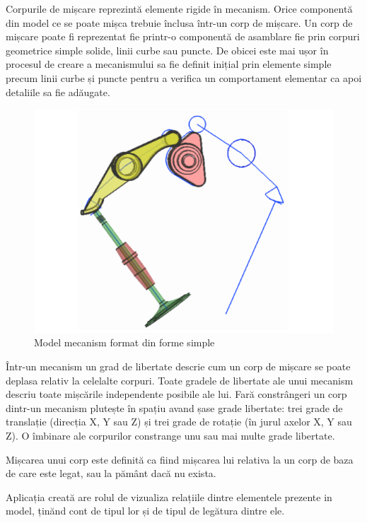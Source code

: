 
Corpurile de mișcare reprezintă elemente rigide în mecanism. Orice componentă din model ce se poate mișca trebuie 
înclusa într-un corp de mișcare. Un corp de mișcare poate fi reprezentat fie printr-o componentă de asamblare fie 
prin corpuri geometrice simple solide, linii curbe sau puncte. De obicei este mai ușor în procesul de creare a mecanismului sa 
fie definit inițial prin elemente simple precum linii curbe și puncte pentru a verifica un comportament elementar 
ca apoi detaliile sa fie adăugate.\newline

\begin{figure}[H]
    \begin{center}
        \includegraphics[scale=0.7]{imagini/simcenter/body.png}
        \caption{Model mecanism format din forme simple\protect\footnotemark}
        \label{fig:mecanims_curbe}
    \end{center}    
\end{figure}


Într-un mecanism un grad de libertate descrie cum un corp de mișcare se poate deplasa relativ la celelalte corpuri. 
Toate gradele de libertate ale unui mecanism descriu toate mișcările independente posibile ale lui. Fară constrângeri 
un corp dintr-un mecanism plutește în spațiu avand șase grade libertate: trei grade de translație (direcția X, Y sau Z) 
și trei grade de rotație (în jurul axelor X, Y sau Z). O îmbinare ale corpurilor constrange unu sau mai multe grade libertate.\newline

Mișcarea unui corp este definită ca fiind mișcarea lui relativa la un corp de baza de care este legat, sau la pământ dacă nu exista.\newline

Aplicația creată are rolul de vizualiza relațiile dintre elementele prezente in model, ținănd cont de tipul lor și de tipul de legătura dintre ele.
